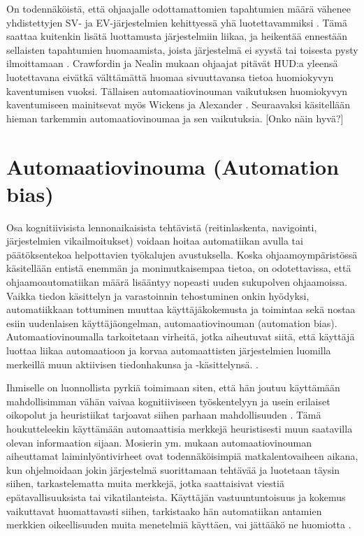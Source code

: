 \documentclass[utf8,bachelor,manualbib]{gradu3}
\begin{document}
On todennäköistä, että ohjaajalle odottamattomien tapahtumien määrä vähenee yhdistettyjen SV- ja EV-järjestelmien kehittyessä yhä luotettavammiksi \citep{kornym2009}. Tämä saattaa kuitenkin lisätä luottamusta järjestelmiin liikaa, ja heikentää ennestään sellaisten tapahtumien huomaamista, joista järjestelmä ei syystä tai toisesta pysty ilmoittamaan \citep{molloyparasuraman1996}. Crawfordin ja Nealin \citeyearpar{crawfordneal2006} mukaan ohjaajat pitävät HUD:a yleensä luotettavana eivätkä välttämättä huomaa sivuuttavansa tietoa huomiokyvyn kaventumisen vuoksi. Tällaisen automaatiovinouman \citep{mosierym1998} vaikutuksen huomiokyvyn kaventumiseen mainitsevat myös Wickens ja Alexander \citeyearpar{wickensalexander2009}. Seuraavaksi käsitellään hieman tarkemmin automaatiovinoumaa ja sen vaikutuksia. [Onko näin hyvä?]

\section{Automaatiovinouma (Automation bias)}

Osa kognitiivisista lennonaikaisista tehtävistä (reitinlaskenta, navigointi, järjestelmien vikailmoitukset) voidaan hoitaa automatiikan avulla tai päätöksentekoa helpottavien työkalujen avustuksella. Koska ohjaamoympäristössä käsitellään entistä enemmän ja monimutkaisempaa tietoa, on odotettavissa, että ohjaamoautomatiikan määrä lisääntyy nopeasti uuden sukupolven ohjaamoissa. Vaikka tiedon käsittelyn ja varastoinnin tehostuminen onkin hyödyksi, automatiikkaan tottuminen muuttaa käyttäjäkokemusta ja toimintaa sekä nostaa esiin uudenlaisen käyttäjäongelman, automaatiovinouman (automation bias). Automaatiovinoumalla tarkoitetaan virheitä, jotka aiheutuvat siitä, että käyttäjä luottaa liikaa automaatioon ja korvaa automaattisten järjestelmien luomilla merkeillä muun aktiivisen tiedonhakunsa ja -käsittelynsä. \citep{mosierym1998}.

Ihmiselle on luonnollista pyrkiä toimimaan siten, että hän joutuu käyttämään mahdollisimman vähän vaivaa kognitiiviseen työskentelyyn ja usein erilaiset oikopolut ja heuristiikat tarjoavat siihen parhaan mahdollisuuden \citep{fisketaylor1994}. Tämä houkutteleekin käyttämään automaattisia merkkejä heuristisesti muun saatavilla olevan informaation sijaan. Mosierin ym. \citeyearpar{mosierym1994} mukaan automaatiovinouman aiheuttamat laiminlyöntivirheet ovat todennäköisimpiä matkalentovaiheen aikana, kun ohjelmoidaan jokin järjestelmä suorittamaan tehtävää ja luotetaan täysin siihen, tarkastelematta muita merkkejä, jotka saattaisivat viestiä epätavallisuuksista tai vikatilanteista. Käyttäjän vastuuntuntoisuus ja kokemus vaikuttavat huomattavasti siihen, tarkistaako hän automatiikan antamien merkkien oikeellisuuden muita menetelmiä käyttäen, vai jättääkö ne huomiotta \citep{mosierym1998}.
\end{document}
